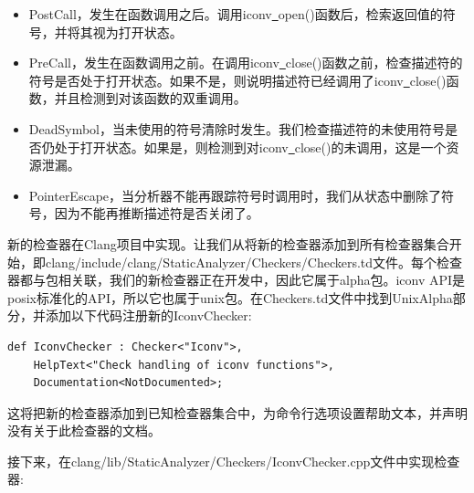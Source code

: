 \begin{itemize}
\item PostCall，发生在函数调用之后。调用iconv\underline{~}open()函数后，检索返回值的符号，并将其视为打开状态。

\item PreCall，发生在函数调用之前。在调用iconv\underline{~}close()函数之前，检查描述符的符号是否处于打开状态。如果不是，则说明描述符已经调用了iconv\underline{~}close()函数，并且检测到对该函数的双重调用。

\item DeadSymbol，当未使用的符号清除时发生。我们检查描述符的未使用符号是否仍处于打开状态。如果是，则检测到对iconv\underline{~}close()的未调用，这是一个资源泄漏。

\item PointerEscape，当分析器不能再跟踪符号时调用时，我们从状态中删除了符号，因为不能再推断描述符是否关闭了。

\end{itemize}

新的检查器在Clang项目中实现。让我们从将新的检查器添加到所有检查器集合开始，即clang/include/clang/StaticAnalyzer/Checkers/Checkers.td文件。每个检查器都与包相关联，我们的新检查器正在开发中，因此它属于alpha包。iconv API是posix标准化的API，所以它也属于unix包。在Checkers.td文件中找到UnixAlpha部分，并添加以下代码注册新的IconvChecker:\par

\begin{lstlisting}[caption={}]
def IconvChecker : Checker<"Iconv">,
	HelpText<"Check handling of iconv functions">,
	Documentation<NotDocumented>;
\end{lstlisting}

这将把新的检查器添加到已知检查器集合中，为命令行选项设置帮助文本，并声明没有关于此检查器的文档。\par

接下来，在clang/lib/StaticAnalyzer/Checkers/IconvChecker.cpp文件中实现检查器:\par

